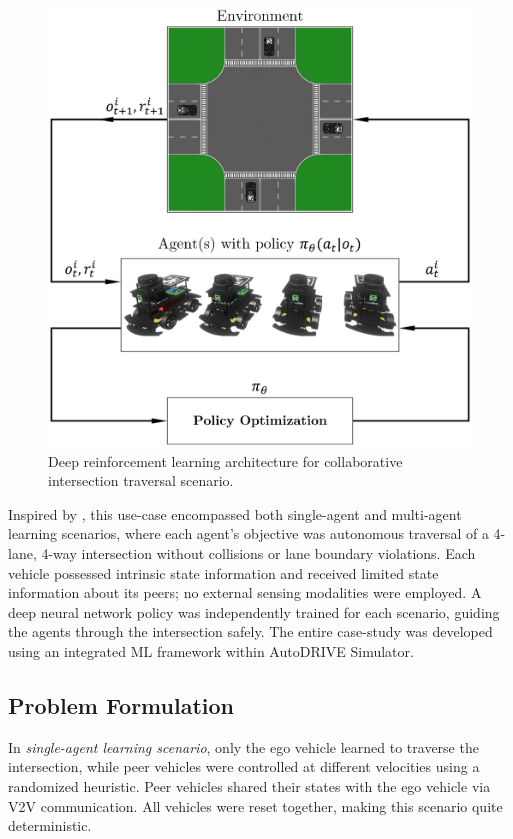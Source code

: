 \documentclass[letterpaper, 10 pt, conference]{ieeeconf}  %
\begin{document}
\begin{figure}[ht]
     \centering
     \includegraphics[width=\linewidth]{Fig4.png}
     \caption{Deep reinforcement learning architecture for collaborative intersection traversal scenario.}
     \label{fig4}
\end{figure}

Inspired by \cite{9316033}, this use-case encompassed both single-agent and multi-agent learning scenarios, where each agent's objective was autonomous traversal of a 4-lane, 4-way intersection without collisions or lane boundary violations. Each vehicle possessed intrinsic state information and received limited state information about its peers; no external sensing modalities were employed. A deep neural network policy was independently trained for each scenario, guiding the agents through the intersection safely. The entire case-study was developed using an integrated ML framework \cite{MLAgents2018} within AutoDRIVE Simulator.

\subsection{Problem Formulation}
\label{Sub-Section: Problem Formulation I}

In \textit{single-agent learning scenario}, only the ego vehicle learned to traverse the intersection, while peer vehicles were controlled at different velocities using a randomized heuristic. Peer vehicles shared their states with the ego vehicle via V2V communication. All vehicles were reset together, making this scenario quite deterministic.
\end{document}
